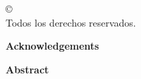 
  \onehalfspacing


  \cleardoublepage
  \thispagestyle{empty}
  \begin{center}
    \copyright\ \nombreautor\ \anio \\
    Todos los derechos reservados.
  \end{center}



  \cleardoublepage {}
  \begin{center} \Large \textbf{Acknowledgements} \end{center}




  \cleardoublepage
   
  \begin{center} \Large \textbf{Abstract} \end{center}







  \cleardoublepage
  \tableofcontents
  \cleardoublepage
  \listoffigures
  \cleardoublepage
  \listoftables
  \cleardoublepage

  \normalsize

